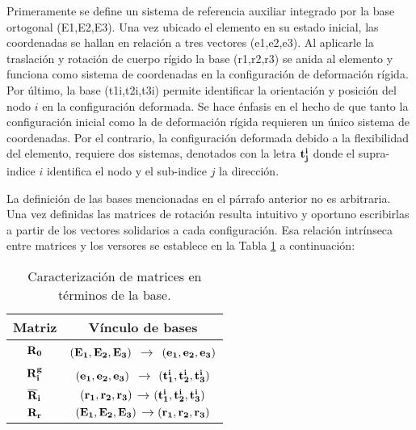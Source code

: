 Primeramente se define un sistema de referencia auxiliar integrado por la base ortogonal (\gls{E1},\gls{E2},\gls{E3}). Una vez ubicado el elemento en su estado inicial, las coordenadas se hallan en relación a tres vectores (\gls{e1},\gls{e2},\gls{e3}). Al aplicarle la traslación y rotación de cuerpo rígido la base (\gls{r1},\gls{r2},\gls{r3}) se anida al elemento y funciona como sistema de coordenadas en la configuración de deformación rígida. Por último, la base (\gls{t1i},\gls{t2i},\gls{t3i}) permite identificar la orientación y posición del nodo $i$ en la configuración deformada. Se hace énfasis en el hecho de que tanto la configuración inicial como la de deformación rígida requieren un único sistema de coordenadas. Por el contrario, la configuración deformada debido a la flexibilidad del elemento, requiere dos sistemas, denotados con la letra $\bf{t}_j^i$ donde el supra-indice $i$ identifica el nodo y el sub-indice $j$ la dirección.


La definición de las bases mencionadas en el párrafo anterior no es arbitraria. Una vez definidas las matrices de rotación resulta intuitivo y oportuno escribirlas a partir de los vectores solidarios a cada configuración. Esa relación intrínseca entre matrices y los versores se establece en la Tabla \ref{Table:PRE:RelacionVM} a continuación:

\begin{table}[htbp]
	\begin{center}
		\begin{tabular}{|c|c|}
			\hline
			Matriz & Vínculo de bases \\
			\hline \hline
			$\bf{R}_0$ &$(\bf{E_1},\bf{E_2},\bf{E_3})$ $\rightarrow$
			$(\bf{e_1},\bf{e_2},\bf{e_3})$   \\ \hline
			$\bf{R}_i^g$ & $(\bf{e_1},\bf{e_2},\bf{e_3})$ $\rightarrow$
			$(\bf{t_1^i},\bf{t_2^i},\bf{t_3^i})$ \\ \hline
			$\bf{\overline{R}}_i$ &
			$(\bf{r_1},\bf{r_2},\bf{r_3})$$\rightarrow$$(\bf{t_1^i},\bf{t_2^i},\bf{t_3^i})$
			\\ \hline
			$\bf{R}_r$ &
			$(\bf{E_1},\bf{E_2},\bf{E_3})$$\rightarrow$$(\bf{r_1},\bf{r_2},\bf{r_3})$ \\
			\hline
		\end{tabular}
		\caption{Caracterización de matrices en términos de la base.}
		\label{Table:PRE:RelacionVM}
	\end{center}
\end{table}


